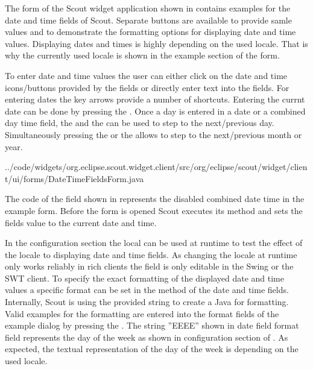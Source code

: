 \documentclass[a4paper,10pt,twoside]{book}
\begin{document}
{The form  of the Scout widget application shown in  contains examples for the date and time fields of Scout.
Separate buttons are available to provide samle values and to demonstrate the formatting options for displaying date and time values.
Displaying dates and times is highly depending on the used locale.
That is why the currently used locale is shown in the example section of the form.

To enter date and time values the user can either click on the date and time icons/buttons provided by the fields or directly enter text into the fields. 
For entering dates the key arrows provide a number of shortcuts. 
Entering the currnt date can be done by pressing the . 
Once a day is entered in a date or a combined day time field, the  and the  can be used to step to the next/previous day. 
Simultaneously pressing the  or the  allows to step to the next/previous month or year.


{../code/widgets/org.eclipse.scout.widget.client/src/org/eclipse/scout/widget/client/ui/forms/DateTimeFieldsForm.java}

The code of the  field shown in  represents the disabled combined date time in the example form. 
Before the form is opened Scout executes its  method and sets the fields value to the current date and time. 

In the configuration section the local can be used at runtime to test the effect of the locale to displaying date and time fields. 
As changing the locale at runtime only works reliably in rich clients the field is only editable in the Swing or the SWT client. 
To specify the exact formatting of the displayed date and time values a specific format can be set in the  method of the date and time fields. 
Internally, Scout is using the provided string to create a Java  for formatting. 
Valid examples for the formatting are entered into the format fields of the example dialog by pressing the . 
The string ''EEEE'' shown in date field format field represents the day of the week as shown in configuration section of . 
As expected, the textual representation of the day of the week is depending on the used locale. 

}
\end{document}
